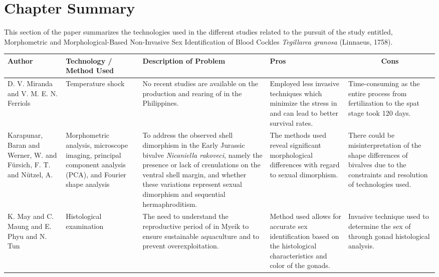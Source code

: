 \section{Chapter Summary}
This section of the paper summarizes the technologies used in the different studies related to the pursuit of the study entitled, Morphometric and Morphological-Based Non-Invasive Sex Identification of Blood Cockles \textit{Tegillarca granosa} (Linnaeus, 1758).

\begin{table}[]
	\centering
	\renewcommand{\arraystretch}{3} 
	\begin{adjustbox}{scale=0.55,center}
		\normalsize
		\begin{tabular}{|p{5cm}|p{5cm}|p{8cm}|p{8cm}|p{8cm}|}
			\hline
			\centering
			\textbf{Author} &
			\centering
			\textbf{Technology / Method Used} &
			\centering
			\textbf{Description of Problem} &
			\centering
			\textbf{Pros} &
			\multicolumn{1}{c|}{\textbf{Cons}} \\ \hline
			
			D. V. Miranda and V. M. E. N. Ferriols &
			Temperature shock &
			No recent studies are available on the production and rearing of \textit{\Tgranosa} in the Philippines. &
			Employed less invasive techniques which minimize the stress in \textit{\Tgranosa} and can lead to better survival rates. &
			Time-consuming as the entire process from fertilization to the spat stage took 120 days. \\ \hline
			
			Karapunar, Baran and Werner, W. and Fürsich, F. T. and Nützel, A. &
			Morphometric analysis, microscope imaging, principal component analysis (PCA), and Fourier shape analysis &
			To address the observed shell dimorphism in the Early Jurassic bivalve \textit{Nicaniella rakoveci}, namely the presence or lack of crenulations on the ventral shell margin, and whether these variations represent sexual dimorphism and sequential hermaphroditism. &
			The methods used reveal significant morphological differences with regard to sexual dimorphism. &
			There could be misinterpretation of the shape differences of bivalves due to the constraints and resolution of technologies used. \\ \hline
			
			K. May and C. Maung and E. Phyu and N. Tun &
			Histological examination &
			The need to understand the reproductive period of \textit{\Tgranosa} in Myeik to ensure sustainable aquaculture and to prevent overexploitation. &
			Method used allows for accurate sex identification based on the histological characteristics and color of the gonads. &
			Invasive technique used to determine the sex of \textit{\Tgranosa} through gonad histological analysis. \\ \hline
			

\end{tabular}
\end{adjustbox}
\end{table}
